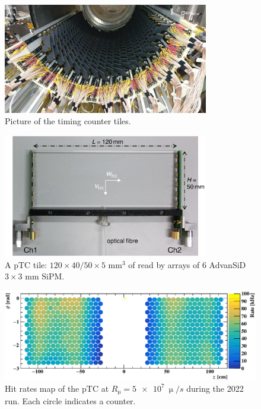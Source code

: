 \begin{refsection}
        \begin{figure}
            \centering
            \includegraphics[width = 0.8\textwidth]{Figures/MEG/pTC.png}
            \caption{Picture of the timing counter tiles.}
            \label{fig:MEGII:pTC}
        \end{figure}

        \begin{figure}
            \centering
            \includegraphics[width = 0.8\textwidth]{Figures/MEG/pTC_tile.png}
            \caption{A pTC tile: $120\times40/50\times5$ mm$^3$ of  read by arrays of 6 AdvanSiD $3\times3$ mm SiPM.}
            \label{fig:MEGII:pTC:tile}
        \end{figure}

        \begin{figure}
            \centering
            \includegraphics[width = \textwidth]{Figures/MEG/pTC_rate.png}
            \caption{Hit rates map of the pTC at $R_\upmu = \SI{5e7}{\upmu \per s}$ during the 2022 run. Each circle indicates a counter.}
            \label{fig:MEGII:pTC:rate}
        \end{figure}
        

\end{refsection}

